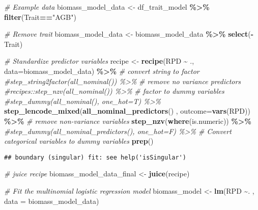 \documentclass[
]{article}
\newenvironment{Shaded}{\begin{snugshade}}{\end{snugshade}}
\newcommand{\AttributeTok}[1]{\textcolor[rgb]{0.13,0.29,0.53}{#1}}
\newcommand{\CommentTok}[1]{\textcolor[rgb]{0.56,0.35,0.01}{\textit{#1}}}
\newcommand{\FunctionTok}[1]{\textcolor[rgb]{0.13,0.29,0.53}{\textbf{#1}}}
\newcommand{\NormalTok}[1]{#1}
\newcommand{\OtherTok}[1]{\textcolor[rgb]{0.56,0.35,0.01}{#1}}
\newcommand{\SpecialCharTok}[1]{\textcolor[rgb]{0.81,0.36,0.00}{\textbf{#1}}}
\newcommand{\StringTok}[1]{\textcolor[rgb]{0.31,0.60,0.02}{#1}}
\begin{document}
\begin{Shaded}
\begin{Highlighting}[]
\CommentTok{\# Example data}
\NormalTok{biomass\_model\_data }\OtherTok{\textless{}{-}}\NormalTok{ df\_trait\_model }\SpecialCharTok{\%\textgreater{}\%} \FunctionTok{filter}\NormalTok{(Trait}\SpecialCharTok{==}\StringTok{"AGB"}\NormalTok{)}

\CommentTok{\# Remove trait}
\NormalTok{biomass\_model\_data }\OtherTok{\textless{}{-}}\NormalTok{ biomass\_model\_data }\SpecialCharTok{\%\textgreater{}\%} \FunctionTok{select}\NormalTok{(}\SpecialCharTok{{-}}\NormalTok{Trait)}

\CommentTok{\# Standardize predictor variables}
\NormalTok{recipe }\OtherTok{\textless{}{-}} \FunctionTok{recipe}\NormalTok{(RPD }\SpecialCharTok{\textasciitilde{}}\NormalTok{ ., }\AttributeTok{data=}\NormalTok{biomass\_model\_data) }\SpecialCharTok{\%\textgreater{}\%}
    \CommentTok{\# convert string to factor}
    \CommentTok{\#step\_string2factor(all\_nominal()) \%\textgreater{}\%}
    \CommentTok{\# remove no variance predictors }
    \CommentTok{\#recipes::step\_nzv(all\_nominal()) \%\textgreater{}\%}
    \CommentTok{\# factor to  dummy variables}
    \CommentTok{\#step\_dummy(all\_nominal(), one\_hot=T) \%\textgreater{}\%}
    \FunctionTok{step\_lencode\_mixed}\NormalTok{(}\FunctionTok{all\_nominal\_predictors}\NormalTok{() , }\AttributeTok{outcome=}\FunctionTok{vars}\NormalTok{(RPD)) }\SpecialCharTok{\%\textgreater{}\%}
    \CommentTok{\# remove non{-}variance variables}
    \FunctionTok{step\_nzv}\NormalTok{(}\FunctionTok{where}\NormalTok{(is.numeric)) }\SpecialCharTok{\%\textgreater{}\%}
    \CommentTok{\#step\_dummy(all\_nominal\_predictors(), one\_hot=F) \%\textgreater{}\%  \# Convert categorical   variables to dummy variables}
    \FunctionTok{prep}\NormalTok{()}
\end{Highlighting}
\end{Shaded}

\begin{verbatim}
## boundary (singular) fit: see help('isSingular')
\end{verbatim}

\begin{Shaded}
\begin{Highlighting}[]
\CommentTok{\# juice recipe}
\NormalTok{biomass\_model\_data\_final }\OtherTok{\textless{}{-}} \FunctionTok{juice}\NormalTok{(recipe)}

\CommentTok{\# Fit the multinomial logistic regression model}
\NormalTok{biomass\_model }\OtherTok{\textless{}{-}} \FunctionTok{lm}\NormalTok{(RPD }\SpecialCharTok{\textasciitilde{}}\NormalTok{. , }\AttributeTok{data =}\NormalTok{ biomass\_model\_data)}
\end{Highlighting}
\end{Shaded}
\end{document}
